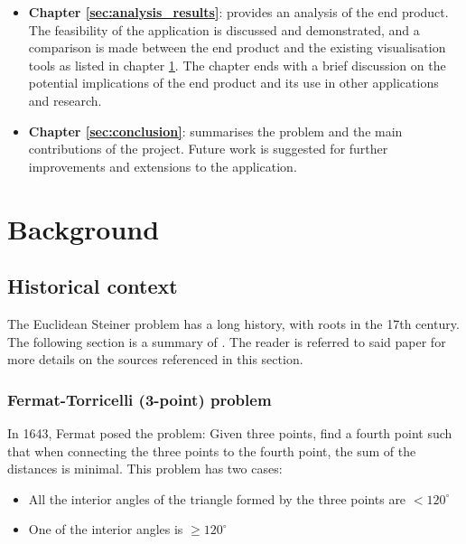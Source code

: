 \documentclass{l4proj}
\begin{document}
\begin{itemize}
    \item \textbf{Chapter \ref{sec:analysis_results}}: provides an analysis of the end product. The feasibility of the application is discussed and demonstrated, and a comparison is made between the end product and the existing visualisation tools as listed in chapter \ref{sec:background}. The chapter ends with a brief discussion on the potential implications of the end product and its use in other applications and research.
    \item \textbf{Chapter \ref{sec:conclusion}}: summarises the problem and the main contributions of the project. Future work is suggested for further improvements and extensions to the application.
\end{itemize}






\chapter{Background}
\label{sec:background}
\section{Historical context}
The Euclidean Steiner problem has a long history, with roots in the 17th century. The following section is a summary of \cite{Brazil2014}. The reader is referred to said paper for more details on the sources referenced in this section.

\subsection{Fermat-Torricelli (3-point) problem}
In 1643, Fermat \citep[p.~135]{Fermat} posed the problem: Given three points, find a fourth point such that when connecting the three points to the fourth point, the sum of the distances is minimal. This problem has two cases:
\begin{itemize}
    \item All the interior angles of the triangle formed by the three points are $< 120^\circ$
    \item One of the interior angles is $\geq 120^\circ$
\end{itemize}
\end{document}

